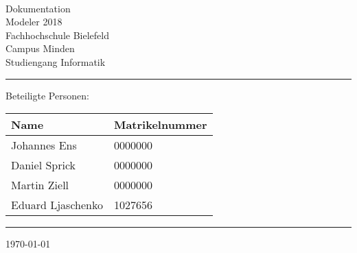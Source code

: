 


\begin{titlepage}
   \mbox{}\vspace{5\baselineskip}\\
   \sffamily\huge
   \centering
   {\Huge Dokumentation} \\
   \normalsize Modeler 2018
   \vspace{3\baselineskip}\\
   \rmfamily\Large
  Fachhochschule Bielefeld \\
  Campus Minden \\
  Studiengang Informatik
   \vspace{1\baselineskip}\\
\noindent\rule{15cm}{0.3pt}
Beteiligte Personen:
\begin{table}[H]
	\tablestyle
	\begin{tabular}{*{2}{v{0.45\textwidth}}}
		\hline
		\textbf{Name} &
		\textbf{Matrikelnummer} \tabularnewline
		\hline
		Johannes Ens & 0000000\tabularnewline
		Daniel Sprick & 0000000\tabularnewline
		Martin Ziell & 0000000\tabularnewline
		Eduard Ljaschenko& 1027656\tabularnewline

	\end{tabular}
\end{table}
   \noindent\rule{15cm}{0.4pt}

   \today
\end{titlepage}

